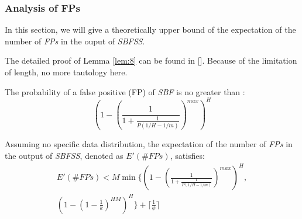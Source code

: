\documentclass[conference]{IEEEtran}
\begin{document}
\subsubsection{\textbf{Analysis of FPs}}
In this section, we will give a theoretically upper bound of the expectation of the number of \emph{FPs} in the ouput of \emph{SBFSS}.\par
The detailed proof of Lemma \ref{lem:8} can be found in []. Because of the limitation of length, no more tautology here.
\begin{lemma}\label{lem:8}
The probability of a false positive (FP) of \emph{SBF} is no greater than :
\begin{equation}
(1-(\frac{1}{1+\frac{1}{P(1/H-1/m)}})^{max})^H
\end{equation}
\end{lemma}

\begin{theorem}\label{thm:6}
Assuming no specific data distribution, the expectation of the number of \emph{FPs} in the output of \emph{SBFSS}, denoted as $E'(\#FPs)$, satisfies:
\begin{eqnarray}\label{eq:17}
E'(\#FPs)<M \min \{(1-(\frac{1}{1+\frac{1}{P(1/H-1/m)}})^{max})^H,\\\nonumber
	(1-(1-\frac{1}{k})^{HM})^H\} + \lceil\frac{1}{\phi}\rceil
\end{eqnarray}
\end{theorem}
\end{document}
